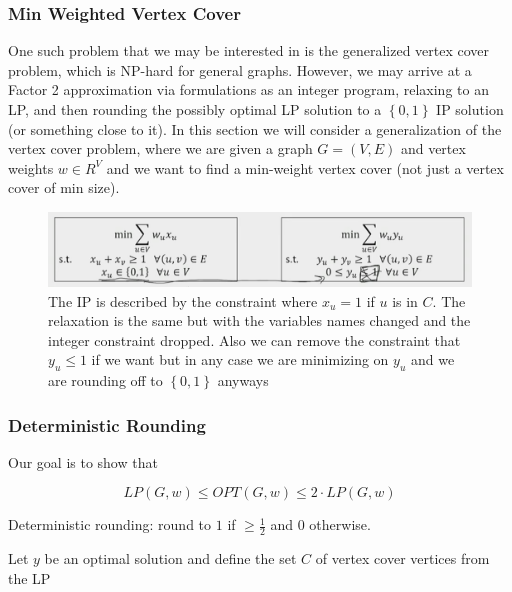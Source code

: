 \documentclass[../notes.tex]{subfiles}
\begin{document}
\subsubsection{Min Weighted Vertex Cover}
One such problem that we may be interested in is the generalized vertex cover problem, which is NP-hard for general graphs. However, we may arrive at a Factor 2 approximation via formulations as an integer program, relaxing to an LP, and then rounding the possibly optimal LP solution to a $ \left\{ 0, 1 \right\}  $ IP solution (or something close to it).
In this section we will consider a generalization of the vertex cover problem, where we are given a graph $ G = (V, E) $ and vertex weights $ w \in R^V $ and we want to find a min-weight vertex cover (not just a vertex cover of min size).
\begin{figure}[H]
    \centering
    \includegraphics[width=0.8\linewidth]{img/image_2023-04-06-13-36-55.png}
    \caption{The IP is described by the constraint where $ x_u = 1 $ if $ u $ is in $ C $. The relaxation is the same but with the variables names changed and the integer constraint dropped. Also we can remove the constraint that $ y_u \le 1 $ if we want but in any case we are minimizing on $ y_u $ and we are rounding off to $ \left\{ 0, 1 \right\}  $ anyways}
\end{figure}


\subsubsection{Deterministic Rounding}
Our goal is to show that 

\begin{equation} 
    LP(G, w) \le OPT(G, w) \le 2 \cdot  LP(G, w)
\end{equation}

\begin{blockquote}
    Deterministic rounding: round to $ 1 $ if $ \ge \frac{1}{2} $ and $ 0 $ otherwise.
\end{blockquote}

Let $ y $ be an optimal solution and define the set $ C $ of vertex cover vertices from the LP
\end{document}
